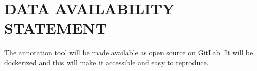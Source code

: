 \chapter{DATA AVAILABILITY STATEMENT}
The annotation tool will be made available as open source on GitLab.
It will be dockerized and this will make it accessible and easy to reproduce.
